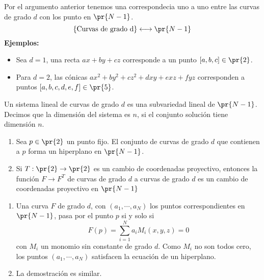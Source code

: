 \documentclass{article}
\begin{document}
\vspace{2mm}
\noindent Por el argumento anterior tenemos una correspondecia uno a uno entre las curvas de grado
$d$ con los punto en $\pr{N-1}$.
\begin{equation*}
    \left\{\text{Curvas de grado d}\right\}\longleftrightarrow\pr{N-1}
\end{equation*}
\noindent\textbf{Ejemplos:}
\begin{itemize}
    \item Sea $d=1$, una recta $ax+by+cz$ corresponde a un punto $[a,b,c]\in\pr{2}$.
    
    \item Para $d=2$, las cónicas $ax^{2}+by^{2}+cz^{2}+dxy+exz+fyz$ corresponden a puntos 
    $[a,b,c,d,e,f]\in\pr{5}$.
\end{itemize}
\begin{dfn}
    Un sistema lineal de curvas de grado $d$ es una subvariedad lineal de $\pr{N-1}$. Decimos que
    la dimensión del sistema es $n$, si el conjunto solución tiene dimensión $n$.
\end{dfn}
\begin{lema}\hspace{1mm}
    \begin{enumerate}
        \item Sea $p\in\pr{2}$ un punto fijo. El conjunto de curvas de grado $d$ que contienen a 
        $p$ forma un hiperplano en $\pr{N-1}$.

        \item Si $T:\pr{2}\to\pr{2}$ es un cambio de coordenadas proyectivo, entonces la función
        $F\to F^{T}$ de curvas de grado $d$ a curvas de grado $d$ es un cambio de coordenadas 
        proyectivo en $\pr{N-1}$
    \end{enumerate}
\end{lema}
\begin{dem}\hspace{1mm}
    \begin{enumerate}
        \item Una curva $F$ de grado $d$, con $(a_{1},\cdots, a_{N})$ los puntos correspondientes
        en $\pr{N-1}$, pasa por el punto $p$ si y solo si
        \begin{equation*}
            F(p)=\sum_{i=1}^{N}a_{i}M_{i}(x,y,z)=0
        \end{equation*}
        con $M_{i}$ un monomio sin constante de grado $d$. Como $M_{i}$ no son todos cero, los 
        puntos $(a_{1},\cdots,a_{N})$ satisfacen la ecuación de un hiperplano.

        \item La demostración es similar.
    \end{enumerate}
\end{dem}
\end{document}
